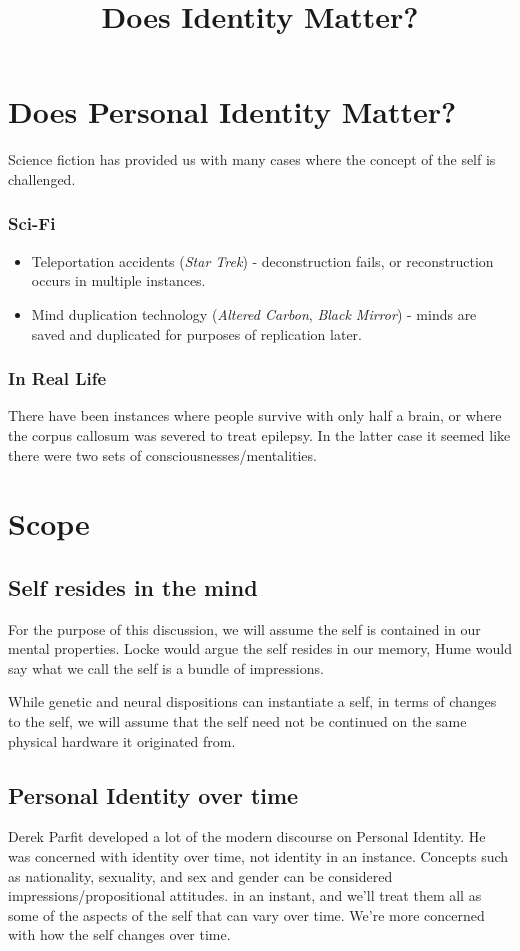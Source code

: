 \documentclass[11pt]{article}
\date{}
\title{Does Identity Matter?}
\begin{document}
\section*{Does Personal Identity Matter?}
\label{sec:org165cbdf}
Science fiction has provided us with many cases where the concept of the self is challenged.

\subsubsection*{Sci-Fi}
\label{sec:orgcc1afd2}
\begin{itemize}
\item Teleportation accidents (\emph{Star Trek}) -
\label{sec:org65c92cf}
deconstruction fails, or reconstruction occurs in multiple instances.

\item Mind duplication technology (\emph{Altered Carbon}, \emph{Black Mirror}) -
\label{sec:org7904153}
minds are saved and duplicated for purposes of replication later.
\end{itemize}

\subsubsection*{In Real Life}
\label{sec:orgb589a9f}
There have been instances where people survive with only half a brain, or where the corpus callosum was severed to treat epilepsy.
In the latter case it seemed like there were two sets of consciousnesses/mentalities.

\section*{Scope}
\label{sec:orge81f7da}
\subsection*{Self resides in the mind}
\label{sec:orgd13a34e}
For the purpose of this discussion,
we will assume the self is contained in our mental properties.
Locke would argue the self resides in our memory, Hume would say what we call the self is a bundle of impressions.

While genetic and neural dispositions can instantiate a self, in terms of changes to the self, we will assume that the self need not be continued on the same physical hardware it originated from.

\subsection*{Personal Identity over time}
\label{sec:org3ba2b1b}
Derek Parfit developed a lot of the modern discourse on Personal Identity.
He was concerned with identity over time, not identity in an instance.
Concepts such as nationality, sexuality, and sex and gender can be considered impressions/propositional attitudes. in an instant, and we'll treat them all as some of the aspects of the self that can vary over time.
We're more concerned with how the self changes over time.
\end{document}
